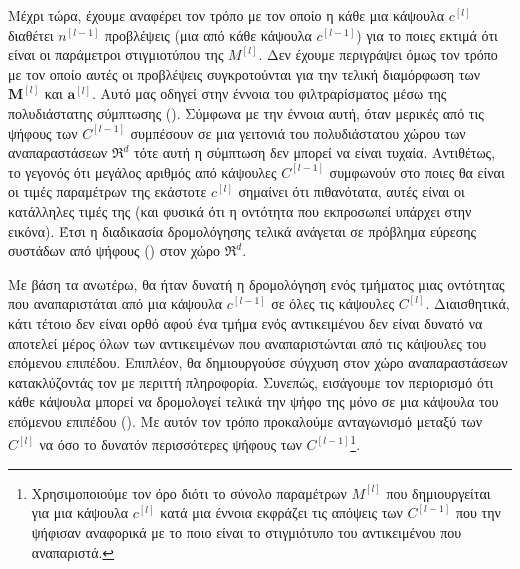 Μέχρι τώρα, έχουμε αναφέρει τον τρόπο με τον οποίο η κάθε μια κάψουλα $c^{[l]}$ διαθέτει $n^{[l-1]}$ προβλέψεις (μια από κάθε κάψουλα $c^{[l-1]}$) για το ποιες εκτιμά ότι είναι οι παράμετροι στιγμιοτύπου της $M^{[l]}$. Δεν έχουμε περιγράψει όμως τον τρόπο με τον οποίο αυτές οι προβλέψεις συγκροτούνται για την τελική διαμόρφωση των $\boldsymbol{M}^{[l]}$ και $\boldsymbol{a}^{[l]}$. Αυτό μας οδηγεί στην έννοια του φιλτραρίσματος μέσω της πολυδιάστατης σύμπτωσης (). Σύμφωνα με την έννοια αυτή, όταν μερικές από τις ψήφους των $C^{[l-1]}$ συμπέσουν σε μια γειτονιά του πολυδιάστατου χώρου των αναπαραστάσεων $\Re^{d}$ τότε αυτή η σύμπτωση δεν μπορεί να είναι τυχαία. Αντιθέτως, το γεγονός ότι μεγάλος αριθμός από κάψουλες $C^{[l-1]}$ συμφωνούν στο ποιες θα είναι οι τιμές παραμέτρων της εκάστοτε $c^{[l]}$ σημαίνει ότι πιθανότατα, αυτές είναι οι κατάλληλες τιμές της (και φυσικά ότι η οντότητα που εκπροσωπεί υπάρχει στην εικόνα). Έτσι η διαδικασία δρομολόγησης τελικά ανάγεται σε πρόβλημα εύρεσης συστάδων από ψήφους () στον χώρο $\Re^{d}$.\par

Με βάση τα ανωτέρω, θα ήταν δυνατή η δρομολόγηση ενός τμήματος μιας οντότητας που αναπαριστάται από μια κάψουλα $c^{[l-1]}$ σε όλες τις κάψουλες $C^{[l]}$. Διαισθητικά, κάτι τέτοιο δεν είναι ορθό αφού ένα τμήμα ενός αντικειμένου δεν είναι δυνατό να αποτελεί μέρος όλων των αντικειμένων που αναπαριστώνται από τις κάψουλες του επόμενου επιπέδου. Επιπλέον, θα δημιουργούσε σύγχυση στον χώρο αναπαραστάσεων κατακλύζοντάς τον με περιττή πληροφορία. Συνεπώς, εισάγουμε τον περιορισμό ότι κάθε κάψουλα μπορεί να δρομολογεί τελικά την ψήφο της μόνο σε μια κάψουλα του επόμενου επιπέδου (). Με αυτόν τον τρόπο προκαλούμε ανταγωνισμό μεταξύ των $C^{[l]}$ να  όσο το δυνατόν περισσότερες ψήφους των $C^{[l-1]}$\footnote{Χρησιμοποιούμε τον όρο  διότι το σύνολο παραμέτρων $M^{[l]}$ που δημιουργείται για μια κάψουλα $c^{[l]}$ κατά μια έννοια εκφράζει τις απόψεις των $C^{[l-1]}$ που την ψήφισαν αναφορικά με το ποιο είναι το στιγμιότυπο του αντικειμένου που αναπαριστά.}.\par

